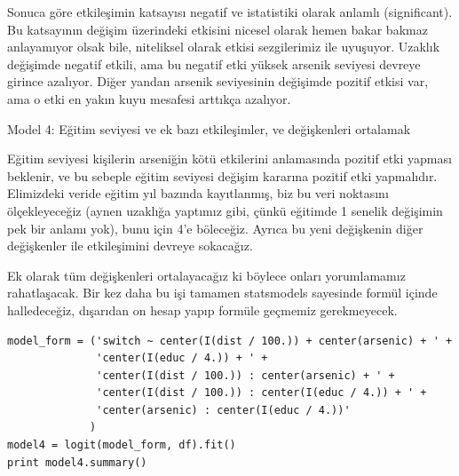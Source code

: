 \documentclass[12pt,fleqn]{article}\usepackage{../../common}
\begin{document}
Sonuca göre etkileşimin katsayısı negatif ve istatistiki olarak anlamlı
(significant). Bu katsayının değişim üzerindeki etkisini nicesel olarak hemen
bakar bakmaz anlayamıyor olsak bile, niteliksel olarak etkisi sezgilerimiz ile
uyuşuyor. Uzaklık değişimde negatif etkili, ama bu negatif etki yüksek arsenik
seviyesi devreye girince azalıyor.  Diğer yandan arsenik seviyesinin değişimde
pozitif etkisi var, ama o etki en yakın kuyu mesafesi arttıkça azalıyor.

Model 4: Eğitim seviyesi ve ek bazı etkileşimler, ve değişkenleri ortalamak

Eğitim seviyesi kişilerin arseniğin kötü etkilerini anlamasında pozitif etki
yapması beklenir, ve bu sebeple eğitim seviyesi değişim kararına pozitif etki
yapmalıdır. Elimizdeki veride eğitim yıl bazında kayıtlanmış, biz bu veri
noktasını ölçekleyeceğiz (aynen uzaklığa yaptımız gibi, çünkü eğitimde 1 senelik
değişimin pek bir anlamı yok), bunu için 4'e böleceğiz. Ayrıca bu yeni
değişkenin diğer değişkenler ile etkileşimini devreye sokacağız.

Ek olarak tüm değişkenleri ortalayacağız ki böylece onları yorumlamamız
rahatlaşacak. Bir kez daha bu işi tamamen statsmodels sayesinde formül içinde
halledeceğiz, dışarıdan on hesap yapıp formüle geçmemiz gerekmeyecek.

\begin{verbatim}
model_form = ('switch ~ center(I(dist / 100.)) + center(arsenic) + ' +
              'center(I(educ / 4.)) + ' +
              'center(I(dist / 100.)) : center(arsenic) + ' + 
              'center(I(dist / 100.)) : center(I(educ / 4.)) + ' + 
              'center(arsenic) : center(I(educ / 4.))'
             )
model4 = logit(model_form, df).fit()
print model4.summary()
\end{verbatim}
\end{document}
